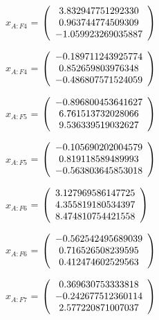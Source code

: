 \begin{description}
$x_{A:F4}$  = $\left( \begin{array} {ccc} 3.832947751292330 \\ 0.963744774509309 \\ -1.059923269035887
\end{array} \right)\\ \\$

$\hat{x}_{A:F4}$  = $\left( \begin{array} {ccc} -0.189711243925774 \\ 0.852659803976348 \\ -0.486807571524059
\end{array} \right)\\ \\$

$x_{A:F5}$  = $\left( \begin{array} {ccc} -0.896800453641627 \\ 6.761513732028066 \\ 9.536339519032627
\end{array} \right)\\ \\$

$\hat{x}_{A:F5}$  = $\left( \begin{array} {ccc} -0.105690202004579 \\ 0.819118589489993 \\ -0.563803645853018
\end{array} \right)\\ \\$

$x_{A:F6}$  = $\left( \begin{array} {ccc} 3.127969586147725 \\ 4.355819180534397 \\ 8.474810754421558
\end{array} \right)\\ \\$

$\hat{x}_{A:F6}$  = $\left( \begin{array} {ccc} -0.562542495689039 \\ 0.716526508239595 \\ 0.412474602529563
\end{array} \right)\\ \\$

$x_{A:F7}$  = $\left( \begin{array} {ccc} 0.369630753333818 \\ -0.242677512360114 \\ 2.577220871007037
\end{array} \right)\\ \\$


\end{description}

